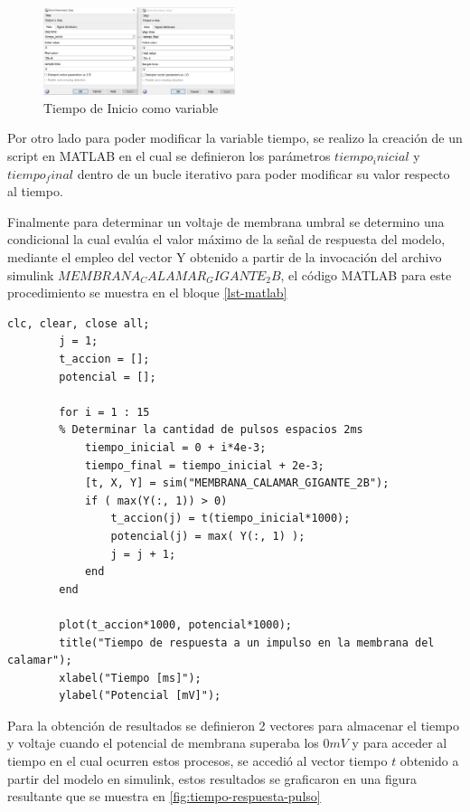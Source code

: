 \documentclass[conference]{IEEEtran}
\begin{document}
	\begin{figure}[h]
		\centering
		\includegraphics[width=0.5\textwidth]{media/tiempos_escalon}
		\caption{Tiempo de Inicio como variable}
		\label{fig:tiemposescalon}
	\end{figure}
	
	Por otro lado para poder modificar la variable tiempo, se realizo la creación de un script en MATLAB en el cual se definieron los parámetros $tiempo_inicial$ y $tiempo_final$ dentro de un bucle iterativo para poder modificar su valor respecto al tiempo.
	
	Finalmente para determinar un voltaje de membrana umbral se determino una condicional la cual evalúa el valor máximo de la señal de respuesta del modelo, mediante el empleo del vector Y obtenido a partir de la invocación del archivo simulink $MEMBRANA_CALAMAR_GIGANTE_2B$, el código MATLAB para este procedimiento se muestra en el bloque \ref{lst-matlab}
	
	\begin{lstlisting}[numbers=none, caption={Variación del tiempo de respuesta de la membrana Axon de calamar}, label=lst-matlab]
		clc, clear, close all;
		j = 1;
		t_accion = [];
		potencial = [];
		
		for i = 1 : 15 
		% Determinar la cantidad de pulsos espacios 2ms
			tiempo_inicial = 0 + i*4e-3;
			tiempo_final = tiempo_inicial + 2e-3;
			[t, X, Y] = sim("MEMBRANA_CALAMAR_GIGANTE_2B");
			if ( max(Y(:, 1)) > 0)
				t_accion(j) = t(tiempo_inicial*1000);
				potencial(j) = max( Y(:, 1) );
				j = j + 1;
			end
		end
		
		plot(t_accion*1000, potencial*1000);
		title("Tiempo de respuesta a un impulso en la membrana del calamar");
		xlabel("Tiempo [ms]");
		ylabel("Potencial [mV]");
	\end{lstlisting}
	
	Para la obtención de resultados se definieron 2 vectores para almacenar el tiempo y voltaje cuando el potencial de membrana superaba los $0 mV$ y para acceder al tiempo en el cual ocurren estos procesos, se accedió al vector tiempo $t$ obtenido a partir del modelo en simulink, estos resultados se graficaron en una figura resultante que se muestra en \ref{fig:tiempo-respuesta-pulso}
	
\end{document}
